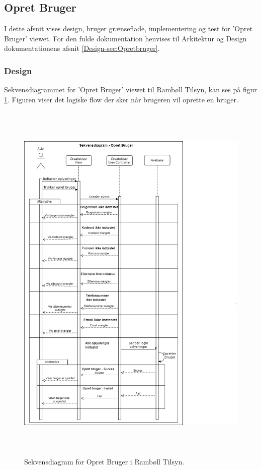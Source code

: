 \subsection{Opret Bruger}
I dette afsnit vises design, bruger grænseflade, implementering og test for 'Opret Bruger' viewet. For den fulde dokumentation henvises til Arkitektur og Design dokumentationens afsnit \ref{Design-sec:Opretbruger}.
\subsubsection{Design}
Sekvensdiagrammet for 'Opret Bruger' viewet til Rambøll Tilsyn, kan ses på figur \ref{fig:OpretBrugerSekvens}. Figuren viser det logiske flow der sker når brugeren vil oprette en bruger.
\begin{figure}[H] %
	\centering
	\includegraphics[height=18cm, width=15cm]{Design/Applikation/OpretBruger/OpretBrugerSekvensDiagram}
	\caption{Sekvensdiagram for Opret Bruger i Rambøll Tilsyn.}
	\label{fig:OpretBrugerSekvens}
\end{figure}

